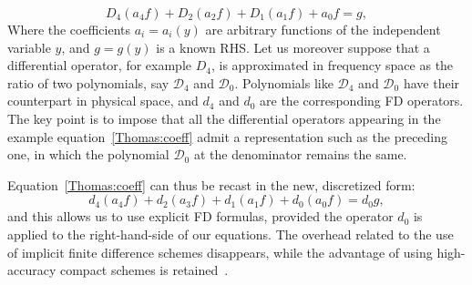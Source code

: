 \begin{equation}
D_{4}(a_{4}f) + D_{2}(a_{2}f)+D_{1}(a_{1}f)+a_{0}f = g,
\label{Thomas:coeff}
\end{equation}
Where the coefficients $a_{i}= a_{i}(y)$ are arbitrary functions of the independent variable $y$, and $g = g(y)$ is a known RHS. Let us moreover suppose that a differential operator, for example $D_{4}$, is approximated in frequency space as the ratio of two polynomials, say $\mathcal{D}_{4}$ and $\mathcal{D}_{0}$. Polynomials like $\mathcal{D}_{4}$ and $\mathcal{D}_{0}$ have their counterpart in physical space, and ${d}_{4}$ and $d_{0}$ are the corresponding FD operators. The key point is to impose that all the differential operators appearing in the example equation~\ref{Thomas:coeff} admit a representation such as the preceding one, in which the polynomial $\mathcal{D}_{0}$ at the denominator remains the same.\par
Equation~\ref{Thomas:coeff} can thus be recast in the new, discretized form:
\begin{equation}
d_{4} (a_{4}f) + d_{2} (a_{3}f) + d_{1} (a_{1}f) + d_{0} (a_{0}f) = d_{0} g,
\end{equation}
and this allows us to use explicit FD formulas, provided the operator $d_{0}$ is applied to the right-hand-side of our equations. The overhead related to the use of implicit finite difference schemes disappears, while the advantage of using high-accuracy compact schemes is retained~\cite{cpl:presentazione}.





